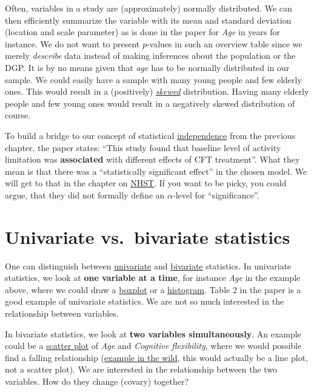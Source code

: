 \documentclass[
]{book}
\begin{document}
Often, variables in a study are (approximately) normally distributed.
We can then efficiently summarize the variable with its mean and standard deviation (location and scale parameter) as is done
in the paper for \emph{Age} in years for instance. We do not want to present \(p\)-values in such an overview table since we merely \emph{describe} data instead of
making inferences about the population or the DGP.
It is by no means given that \emph{age} has to be normally distributed in our sample. We could easily have a sample with many young people and few elderly ones.
This would result in a (positively) \href{https://en.wikipedia.org/wiki/Skewness}{\emph{skewed}} distribution. Having many elderly people and few young ones would
result in a negatively skewed distribution of course.

To build a bridge to our concept of statistical \hyperref[independence_of_events]{independence} from the previous chapter, the paper states:
``This study found that baseline level of activity limitation was \textbf{associated} with different effects of CFT treatment''.
What they mean is that there was a ``statistically significant effect'' in the chosen model. We will get to that in the chapter on \hyperref[nhst]{NHST}.
If you want to be picky, you could argue, that they did not formally define an \(\alpha\)-level for ``significance''.

\section{Univariate vs.~bivariate statistics}\label{univariate-vs.-bivariate-statistics}

One can distinguish between \href{https://en.wikipedia.org/wiki/Univariate_analysis}{univariate} and \href{https://en.wikipedia.org/wiki/Bivariate_analysis}{bivariate} statistics.
In univariate statistics, we look at \textbf{one variable at a time}, for instance \emph{Age} in the example above,
where we could draw a \href{https://en.wikipedia.org/wiki/Box_plot}{boxplot} or a \href{https://en.wikipedia.org/wiki/Histogram}{histogram}.
Table 2 in the paper is a good example of univariate statistics. We are not so much interested in the relationship between variables.

In bivariate statistics, we look at \textbf{two variables simultaneously}.
An example could be a \href{https://en.wikipedia.org/wiki/Scatter_plot}{scatter plot} of \emph{Age} and \emph{Cognitive flexibility},
where we would possible find a falling relationship (\href{https://pmc.ncbi.nlm.nih.gov/articles/PMC4906299/figure/FI00674-1/}{example in the wild}, this would actually be a line plot, not a scatter plot).
We are interested in the relationship between the two variables. How do they change (covary) together?
\end{document}
